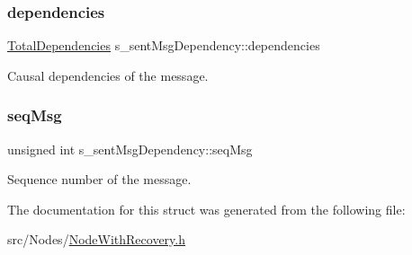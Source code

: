 \subsubsection{\texorpdfstring{dependencies}{dependencies}}
{\footnotesize\ttfamily \hyperlink{class_total_dependencies}{Total\+Dependencies} s\+\_\+sent\+Msg\+Dependency\+::dependencies}



Causal dependencies of the message. 

\mbox{\label{structs__sent_msg_dependency_afd3ba2f762d695961fed00fb401bc3e7}} 
\subsubsection{\texorpdfstring{seq\+Msg}{seqMsg}}
{\footnotesize\ttfamily unsigned int s\+\_\+sent\+Msg\+Dependency\+::seq\+Msg}



Sequence number of the message. 



The documentation for this struct was generated from the following file\+:\begin{DoxyCompactItemize}
\item 
src/\+Nodes/\hyperlink{_node_with_recovery_8h}{Node\+With\+Recovery.\+h}\end{DoxyCompactItemize}
